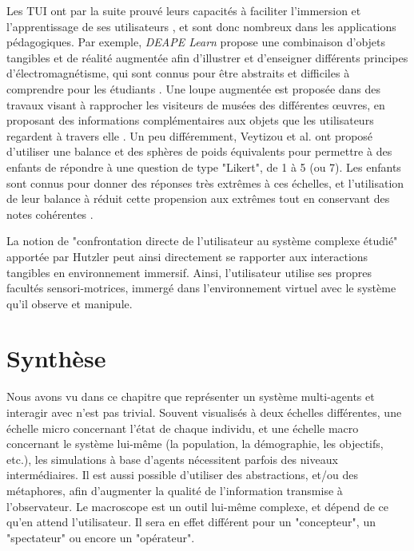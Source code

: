 			Les TUI ont par la suite prouvé leurs capacités à faciliter l'immersion et l'apprentissage de ses utilisateurs \cite{zuckerman_tui_2013, fleck_marker-based_2015, cheng_affordances_2013}, et sont donc nombreux dans les applications pédagogiques. Par exemple, \textit{DEAPE Learn} propose une combinaison d'objets tangibles et de réalité augmentée afin d'illustrer et d'enseigner différents principes d'électromagnétisme, qui sont connus pour être abstraits et difficiles à comprendre pour les étudiants \cite{da_costa_realite_2019}. Une loupe augmentée est proposée dans des travaux visant à rapprocher les visiteurs de musées des différentes œuvres, en proposant des informations complémentaires aux objets que les utilisateurs regardent à travers elle  \cite{damala_loupe_2016}. Un peu différemment, Veytizou et al. ont proposé d'utiliser une balance et des sphères de poids équivalents pour permettre à des enfants de répondre à une question de type "Likert", de 1 à 5 (ou 7). Les enfants sont connus pour donner des réponses très extrêmes à ces échelles, et l'utilisation de leur balance à réduit cette propension aux extrêmes tout en conservant des notes cohérentes \cite{veytizou_could_2018}.
	
	La notion de "confrontation directe de l'utilisateur au système complexe étudié" apportée par Hutzler \cite{hutzler_du_2000} peut ainsi directement se rapporter aux interactions tangibles en environnement immersif. Ainsi, l'utilisateur utilise ses propres facultés sensori-motrices, immergé dans l'environnement virtuel avec le système qu'il observe et manipule.
	
				
	\section*{Synthèse}
	
		Nous avons vu dans ce chapitre que représenter un système multi-agents et interagir avec n'est pas trivial. Souvent visualisés à deux échelles différentes, une échelle micro concernant l'état de chaque individu, et une échelle macro concernant le système lui-même (la population, la démographie, les objectifs, etc.), les simulations à base d'agents nécessitent parfois des niveaux intermédiaires. Il est aussi possible d'utiliser des abstractions, et/ou des métaphores, afin d'augmenter la qualité de l'information transmise à l'observateur. Le macroscope est un outil lui-même complexe, et dépend de ce qu'en attend l'utilisateur. Il sera en effet différent pour un "concepteur", un "spectateur" ou encore un "opérateur".
		
